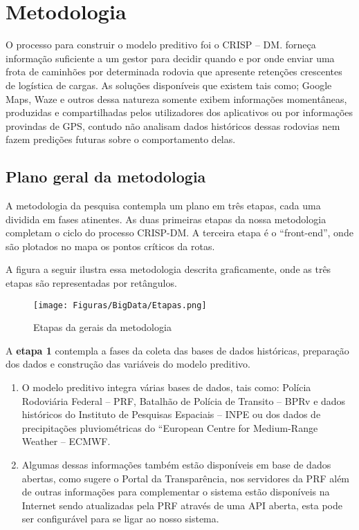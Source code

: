 \chapter{Metodologia}\label{meto}

O processo para construir o modelo preditivo foi o CRISP -- DM. forneça informação suficiente a um gestor para decidir quando e por onde 
enviar uma frota de caminhões por determinada rodovia que apresente retenções crescentes de logística de cargas. As soluções disponíveis que 
existem tais como; Google Maps, Waze e outros dessa natureza somente exibem informações momentâneas, produzidas e compartilhadas pelos utilizadores 
dos aplicativos ou por informações provindas de GPS, contudo não analisam dados históricos dessas rodovias nem fazem predições futuras sobre o 
comportamento delas. \\

\section{Plano geral da metodologia}

A metodologia da pesquisa contempla um plano em três etapas, cada uma dividida em fases atinentes.
As duas primeiras etapas da nossa metodologia completam o ciclo do processo CRISP-DM.
A terceira etapa é o ``front-end'', onde são plotados no mapa os pontos críticos da rotas.

\pagebreak

A figura a seguir ilustra essa metodologia descrita graficamente, onde as três etapas são representadas por retângulos.
 
\begin{figure}[ht]
\centering
\caption{Etapas da gerais da metodologia}
\texttt{[image: Figuras/BigData/Etapas.png]}
\end{figure}

A \textbf{etapa 1} contempla a fases da coleta das bases de dados históricas, preparação dos dados e construção das variáveis do modelo preditivo.
\begin{enumerate}
 \item O modelo preditivo integra várias bases de dados, tais como: Polícia Rodoviária Federal -- PRF, Batalhão de Polícia de Transito -- BPRv e dados históricos 
       do Instituto de Pesquisas Espaciais -- INPE ou dos dados de precipitações pluviométricas do ``European Centre for Medium-Range Weather -- ECMWF.
 
 \item Algumas dessas informações também estão disponíveis em base de dados abertas, como sugere o Portal da Transparência, nos servidores da PRF além de outras informações para complementar o sistema estão 
       disponíveis na Internet sendo atualizadas pela PRF através de uma API aberta, esta pode ser configurável para se ligar ao nosso sistema.
\end{enumerate}

